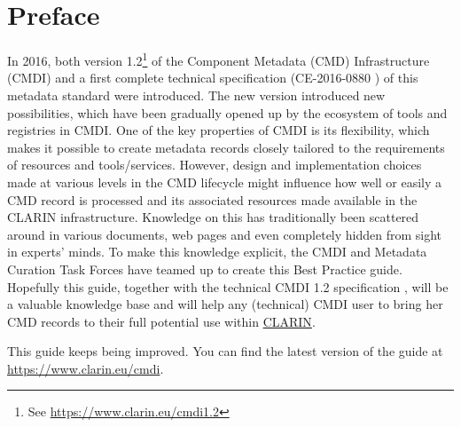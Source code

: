 \section{Preface}
In 2016, both version 1.2\footnote{See \url{https://www.clarin.eu/cmdi1.2}} of
the Component Metadata (CMD) Infrastructure (CMDI) and a first complete technical specification (CE-2016-0880 \cite{ce20130095}) of this metadata standard were introduced. The new version introduced new possibilities, which have been gradually opened up by the ecosystem of tools and registries in CMDI. One of the key properties of CMDI is its flexibility, which makes it possible to create metadata records closely tailored to the requirements of resources and tools/services. However, design and implementation choices made at various levels in the CMD lifecycle might influence how well or easily a CMD record is processed and its associated resources made available in the CLARIN infrastructure. Knowledge on this has traditionally been scattered around in various documents, web pages and even completely hidden from sight in experts' minds. To make this
knowledge explicit, the CMDI and Metadata Curation Task Forces have teamed up to create this Best Practice guide. Hopefully this guide, together with the technical CMDI 1.2 specification \cite{ce20130095}, will be a valuable knowledge base and will help any (technical) CMDI user to bring her CMD records to their full potential use within \href{https://www.clarin.eu}{CLARIN}.

This guide keeps being improved. You can find the latest version of the guide at \url{https://www.clarin.eu/cmdi}.

